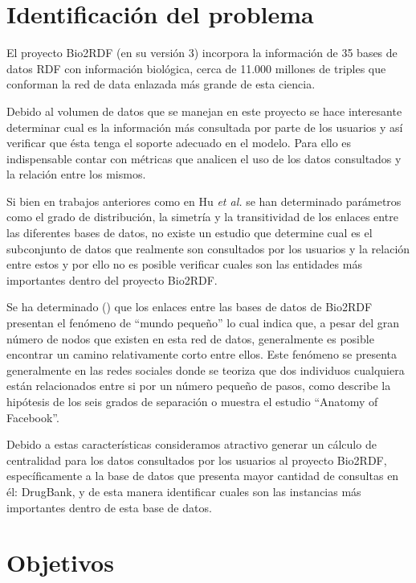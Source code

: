 \section{Identificación del problema}

El proyecto Bio2RDF (en su versión 3) incorpora la información de 35 bases de
datos RDF con información biológica, cerca de 11.000 millones de triples que
conforman la red de data enlazada más grande de esta ciencia.

Debido al volumen de datos que se manejan en este proyecto se hace interesante
determinar cual es la información más consultada por parte de los usuarios y 
así verificar que ésta tenga el soporte adecuado en el modelo. 
Para ello es indispensable contar con métricas que analicen el uso de los datos
consultados y la relación entre los mismos.

Si bien en trabajos anteriores como en Hu \emph{et al.}\cite{hu2015link} se han
determinado parámetros como el grado de distribución, la simetría y la
transitividad de los enlaces entre las diferentes bases de datos, no existe un
estudio que determine cual es el subconjunto de datos que realmente son
consultados por los usuarios y la relación entre estos y por ello no es posible
verificar cuales son las entidades más importantes dentro del proyecto Bio2RDF.

Se ha determinado (\hspace{1sp}\cite{hu2015link}) que los enlaces entre
las bases de datos de Bio2RDF presentan el fenómeno de ``mundo pequeño'' lo cual
indica que, a pesar del gran número de nodos que existen en esta red de datos,
generalmente es posible encontrar un camino relativamente corto entre ellos.
Este fenómeno se presenta generalmente en las redes sociales donde se
teoriza que dos individuos cualquiera están relacionados entre si por un número
pequeño de pasos, como describe la hipótesis de los seis grados de separación o
muestra el estudio ``Anatomy of Facebook''\cite{ugander2011anatomy}.

Debido a estas características consideramos atractivo generar un cálculo de
centralidad para los datos consultados por los usuarios al proyecto Bio2RDF,
específicamente a la base de datos que presenta mayor cantidad de consultas en
él: DrugBank, y de esta manera identificar cuales son las instancias más
importantes dentro de esta base de datos.

\section{Objetivos}

